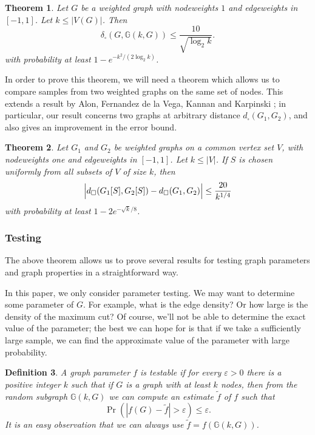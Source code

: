 \documentclass[12pt]{article}
\newtheorem{theorem}{Theorem}[section]
\newtheorem{definition}[theorem]{Definition}
\numberwithin{equation}{section}
\def\eps{\varepsilon}
\def\RandG{{\mathbb G}}
\begin{document}
\begin{theorem}\label{thm:sample}
Let $G$ be a weighted graph with nodeweights $1$ and edgeweights in
$[-1,1]$. Let $k\leq |V(G)|$. Then
\begin{equation}
\label{sample-bd} \delta_\square(G,\RandG(k,G)) \leq
\frac{10}{\sqrt{\log_2 k}}.
\end{equation}
with probability at least $1-e^{-k^2/(2\log_2 k)}$.
\end{theorem}

In order to prove this theorem, we will need a theorem which allows
us to compare samples from two weighted graphs on the same set of
nodes. This extends a result by Alon, Fernandez de la Vega, Kannan
and Karpinski \cite{AFKK,AFKK-Stoc}; in particular,
our result
concerns two graphs at arbitrary distance $d_\square(G_1,G_2)$, and
also gives an improvement in the error bound.

\begin{theorem}\label{thm:dist-test}
Let $G_1$ and $G_2$ be weighted graphs on a common vertex set $V$,
with nodeweights one and edgeweights in $[-1,1]$. Let $k\leq |V|$.
If $S$ is chosen uniformly from all subsets of $V$ of size $k$, then
\begin{equation}
\label{ProbG[X]-G} \Bigl|
d_\square(G_1[S],G_2[S])-d_\square(G_1,G_2) \Bigr|\leq
\frac{20}{k^{1/4}}
\end{equation}
with probability at least $1-2e^{-\sqrt k/8}$.
\end{theorem}

\subsubsection{Testing}

The above theorem allows us to prove several results for testing
graph parameters and graph properties in a straightforward way.

In this paper, we only consider parameter testing. We may want to
determine some parameter of $G$.  For example,
what is the edge density? Or how
large is the density of the maximum cut? Of course, we'll not be
able to determine the exact value of the parameter; the best we can
hope for is that if we take a sufficiently large sample, we can find
the approximate value of the parameter with large probability.


\begin{definition}\label{def:TESTABLE}
A graph parameter $f$ is {\it testable} if for every $\eps>0$ there
is a positive integer $k$ such that if $G$ is a graph with at least
$k$ nodes, then from the random subgraph $\RandG(k,G)$ we can compute
an estimate $\widetilde f$ of $f$ such that
\[
\Pr(|f(G)-\widetilde f|>\eps)\le \eps.
\]
It is an easy observation that we can always use
$\widetilde{f}=f(\RandG(k,G))$.
\end{definition}
\end{document}

